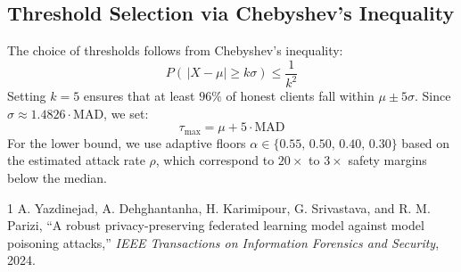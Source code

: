\documentclass[10pt,journal,compsoc]{IEEEtran}
\begin{document}
\subsection{Threshold Selection via Chebyshev's Inequality}
\label{sec:threshold}

The choice of thresholds follows from Chebyshev's inequality:
\begin{equation}
    P\!\left(\,|X - \mu| \geq k\sigma\right) \leq \frac{1}{k^2}
\end{equation}
Setting $k = 5$ ensures that at least $96\%$ of honest clients fall within
$\mu \pm 5\sigma$. Since $\sigma \approx 1.4826 \cdot \mathrm{MAD}$, we set:
\begin{equation}
    \tau_{\max} = \mu + 5 \cdot \mathrm{MAD}
\end{equation}
For the lower bound, we use adaptive floors
$\alpha \in \{0.55,\, 0.50,\, 0.40,\, 0.30\}$ based on the estimated attack
rate $\rho$, which correspond to $20\times$ to $3\times$ safety margins below
the median.


\begin{thebibliography}{1}
A. Yazdinejad, A. Dehghantanha, H. Karimipour, G. Srivastava, and R. M. Parizi,
``A robust privacy-preserving federated learning model against model poisoning attacks,''
\textit{IEEE Transactions on Information Forensics and Security}, 2024.
\end{thebibliography}
\end{document}
